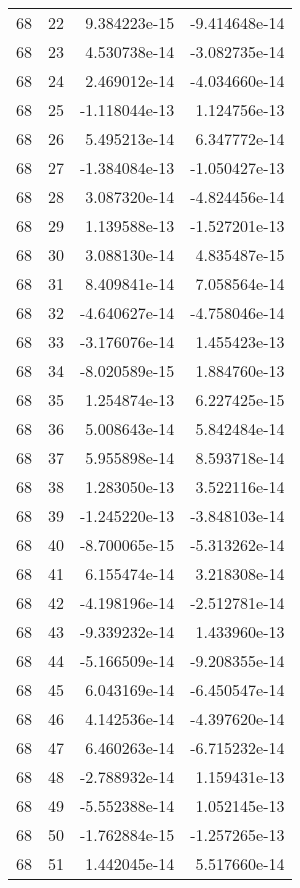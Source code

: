 \begin{tabular}{rrrr}
  68 &   22 &  9.384223e-15 & -9.414648e-14 \\
  68 &   23 &  4.530738e-14 & -3.082735e-14 \\
  68 &   24 &  2.469012e-14 & -4.034660e-14 \\
  68 &   25 & -1.118044e-13 &  1.124756e-13 \\
  68 &   26 &  5.495213e-14 &  6.347772e-14 \\
  68 &   27 & -1.384084e-13 & -1.050427e-13 \\
  68 &   28 &  3.087320e-14 & -4.824456e-14 \\
  68 &   29 &  1.139588e-13 & -1.527201e-13 \\
  68 &   30 &  3.088130e-14 &  4.835487e-15 \\
  68 &   31 &  8.409841e-14 &  7.058564e-14 \\
  68 &   32 & -4.640627e-14 & -4.758046e-14 \\
  68 &   33 & -3.176076e-14 &  1.455423e-13 \\
  68 &   34 & -8.020589e-15 &  1.884760e-13 \\
  68 &   35 &  1.254874e-13 &  6.227425e-15 \\
  68 &   36 &  5.008643e-14 &  5.842484e-14 \\
  68 &   37 &  5.955898e-14 &  8.593718e-14 \\
  68 &   38 &  1.283050e-13 &  3.522116e-14 \\
  68 &   39 & -1.245220e-13 & -3.848103e-14 \\
  68 &   40 & -8.700065e-15 & -5.313262e-14 \\
  68 &   41 &  6.155474e-14 &  3.218308e-14 \\
  68 &   42 & -4.198196e-14 & -2.512781e-14 \\
  68 &   43 & -9.339232e-14 &  1.433960e-13 \\
  68 &   44 & -5.166509e-14 & -9.208355e-14 \\
  68 &   45 &  6.043169e-14 & -6.450547e-14 \\
  68 &   46 &  4.142536e-14 & -4.397620e-14 \\
  68 &   47 &  6.460263e-14 & -6.715232e-14 \\
  68 &   48 & -2.788932e-14 &  1.159431e-13 \\
  68 &   49 & -5.552388e-14 &  1.052145e-13 \\
  68 &   50 & -1.762884e-15 & -1.257265e-13 \\
  68 &   51 &  1.442045e-14 &  5.517660e-14 \\

\end{tabular}
